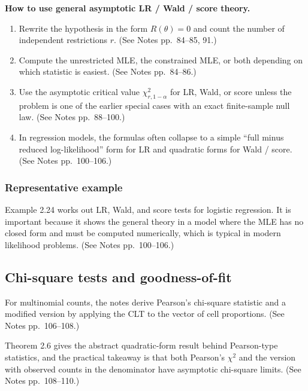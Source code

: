 
\begin{mybox}
\textbf{How to use general asymptotic LR / Wald / score theory.}
\begin{enumerate}
    \item Rewrite the hypothesis in the form $R(\theta)=0$ and count the number of independent restrictions $r$. (See Notes pp.~84--85, 91.)
    \item Compute the unrestricted MLE, the constrained MLE, or both depending on which statistic is easiest. (See Notes pp.~84--86.)
    \item Use the asymptotic critical value $\chi^2_{r,1-\alpha}$ for LR, Wald, or score unless the problem is one of the earlier special cases with an exact finite-sample null law. (See Notes pp.~88--100.)
    \item In regression models, the formulas often collapse to a simple ``full minus reduced log-likelihood'' form for LR and quadratic forms for Wald / score. (See Notes pp.~100--106.)
\end{enumerate}
\end{mybox}


\subsubsection{Representative example}
Example 2.24 works out LR, Wald, and score tests for logistic regression. It is important because it shows the general theory in a model where the MLE has no closed form and must be computed numerically, which is typical in modern likelihood problems. (See Notes pp.~100--106.)

\subsection{Chi-square tests and goodness-of-fit}

For multinomial counts, the notes derive Pearson's chi-square statistic and a modified version by applying the CLT to the vector of cell proportions. (See Notes pp.~106--108.)

Theorem 2.6 gives the abstract quadratic-form result behind Pearson-type statistics, and the practical takeaway is that both Pearson's $\chi^2$ and the version with observed counts in the denominator have asymptotic chi-square limits. (See Notes pp.~108--110.)

